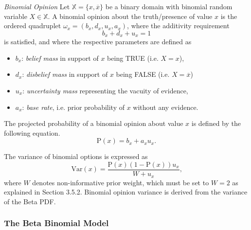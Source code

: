 \begin{definition}
	\emph{Binomial Opinion} Let $\mathbb{X} = \{x, \overline{x}\}$ be a binary domain with binomial random variable $X \in \mathbb{X}$. A binomial opinion about the truth/presence of value $x$ is the ordered quadruplet $\omega_x = \left(b_x, d_x, u_x, a_x\right)$, where the additivity requirement
	\begin{equation}
		b_x + d_x + u_x = 1
	\end{equation}
	is satisfied, and where the respective parameters are defined as
	\begin{itemize}
		\item $b_x$: \emph{belief mass} in support of $x$ being TRUE (i.e. $X = x$),
		\item $d_x$: \emph{disbelief mass} in support of $x$ being FALSE (i.e. $X = \overline{x}$)
		\item $u_x$: \emph{uncertainty mass} representing the vacuity of evidence,
		\item $a_x$: \emph{base rate}, i.e. prior probability of $x$ without any evidence.
	\end{itemize}
\end{definition}

The projected probability of a binomial opinion about value $x$ is defined by the following equation.
\begin{equation}
	\mathrm{P}(x) = b_x + a_x u_x\text{.}
\end{equation}

The variance of binomial options is expressed as
\begin{equation}
	\mathrm{Var}(x) = \dfrac{\mathrm{P}(x)(1 - \mathrm{P}(x))u_x}{W + u_x}\text{,}
\end{equation}
where $W$ denotes non-informative prior weight, which must be set to $W = 2$ as explained in Section 3.5.2. Binomial opinion variance is derived from the variance of the Beta PDF.

\subsubsection{The Beta Binomial Model}
\label{sss:the-beta-binomal-model}

